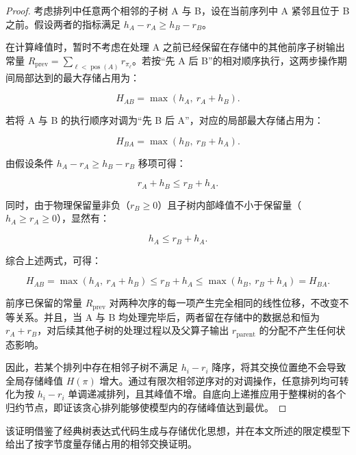 \documentclass[anonymous,withtoc]{gmcm2026}
\begin{document}
\begin{proof} 考虑排列中任意两个相邻的子树 A 与 B，设在当前序列中 A 紧邻且位于 B 之前。假设两者的指标满足 \(h_A - r_A \ge h_B - r_B\)。

在计算峰值时，暂时不考虑在处理 A 之前已经保留在存储中的其他前序子树输出常量 \(R_{\mathrm{prev}} = \sum_{\ell < \operatorname{pos}(A)} r_{\pi_\ell}\)。若按``先 A 后 B''的相对顺序执行，这两步操作期间局部达到的最大存储占用为：

\begin{equation}
H_{AB} = \max(h_A, \ r_A + h_B).
\end{equation}

若将 A 与 B 的执行顺序对调为``先 B 后 A''，对应的局部最大存储占用为：

\begin{equation}
H_{BA} = \max(h_B, \ r_B + h_A).
\end{equation}

由假设条件 \(h_A - r_A \ge h_B - r_B\) 移项可得：

\begin{equation}
r_A + h_B \le r_B + h_A.
\end{equation}

同时，由于物理保留量非负（\(r_B \ge 0\)）且子树内部峰值不小于保留量（\(h_A \ge r_A \ge 0\)），显然有：

\begin{equation}
h_A \le r_B + h_A.
\end{equation}

综合上述两式，可得：

\begin{equation}
H_{AB} = \max(h_A, \ r_A + h_B) \le r_B + h_A \le \max(h_B, \ r_B + h_A) = H_{BA}.
\end{equation}

前序已保留的常量 \(R_{\mathrm{prev}}\) 对两种次序的每一项产生完全相同的线性位移，不改变不等关系。并且，当 A 与 B 均处理完毕后，两者留在存储中的数据总和恒为 \(r_A + r_B\)，对后续其他子树的处理过程以及父算子输出 \(r_{\mathrm{parent}}\) 的分配不产生任何状态影响。

因此，若某个排列中存在相邻子树不满足 \(h_i - r_i\) 降序，将其交换位置绝不会导致全局存储峰值 \(H(\pi)\) 增大。通过有限次相邻逆序对的对调操作，任意排列均可转化为按 \(h_i - r_i\) 单调递减排列，且其峰值不增。自底向上递推应用于整棵树的各个归约节点，即证该贪心排列能够使模型内的存储峰值达到最优。 \end{proof}

该证明借鉴了经典树表达式代码生成与存储优化思想\cite{ref4}，并在本文所述的限定模型下给出了按字节度量存储占用的相邻交换证明。
\end{document}
